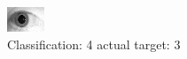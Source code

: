\begin{figure}[h!]
\begin{center}
\includegraphics[width=0.60\columnwidth]{figures/ID1815_class_4_target_3.png}
\end{center}
\caption{ Classification: 4 actual target: 3}
\label{fig:ID1815_class_4_target_3}
\end{figure}
